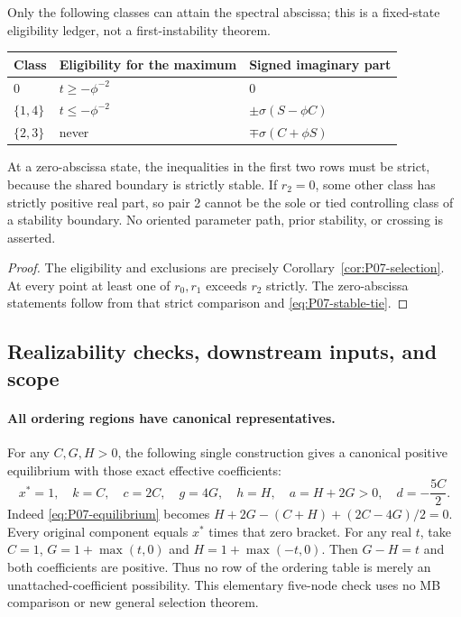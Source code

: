 \begin{proposition}
\label{prop:P07-ledger}
Only the following classes can attain the spectral abscissa; this is a
fixed-state eligibility ledger, not a first-instability theorem.
\begin{center}
\begin{tabular}{@{}l l l@{}}
\toprule
Class&Eligibility for the maximum&Signed imaginary part\\
\midrule
$0$&$t\ge-\phi^{-2}$&$0$\\
$\{1,4\}$&$t\le-\phi^{-2}$&$\pm\sigma(S-\phi C)$\\
$\{2,3\}$&never&$\mp\sigma(C+\phi S)$\\
\bottomrule
\end{tabular}
\end{center}
At a zero-abscissa state, the inequalities in the first two rows must
be strict, because the shared boundary is strictly stable.
If $r_2=0$, some other class has strictly positive real part, so pair 2
cannot be the sole or tied controlling class of a stability boundary.
No oriented parameter path, prior stability, or crossing is asserted.
\end{proposition}
\begin{proof}
The eligibility and exclusions are precisely
Corollary~\ref{cor:P07-selection}. At every point at least one of
$r_0,r_1$ exceeds $r_2$ strictly. The zero-abscissa statements follow
from that strict comparison and \eqref{eq:P07-stable-tie}.
\end{proof}

\subsection{Realizability checks, downstream inputs, and scope}
\paragraph{All ordering regions have canonical representatives.}
For any $C,G,H>0$, the following single construction gives a canonical
positive equilibrium with those exact effective coefficients:
\begin{equation}
 x^*=1,\quad k=C,\quad c=2C,\quad g=4G,\quad h=H,
 \quad a=H+2G>0,\quad d=-\frac{5C}{2}.
 \label{eq:P07-realization}
\end{equation}
Indeed \eqref{eq:P07-equilibrium} becomes
$H+2G-(C+H)+(2C-4G)/2=0$. Every original component equals
$x^*$ times that zero bracket. For any real $t$, take $C=1$,
$G=1+\max(t,0)$ and $H=1+\max(-t,0)$. Then $G-H=t$ and both
coefficients are positive. Thus no row of the ordering table is merely
an unattached-coefficient possibility. This elementary five-node check
uses no MB comparison or new general selection theorem.

